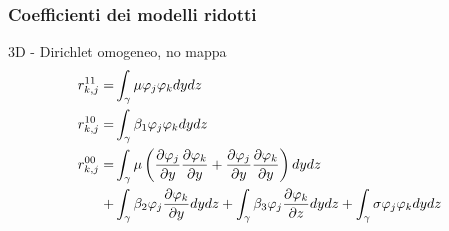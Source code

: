 \hypertarget{coeffRE}
{
\begin{frame}[noframenumbering]
\frametitle{Coefficienti dei modelli ridotti}
\hyperlink{coeffR}{}
\begin{block}{3D - Dirichlet omogeneo, no mappa}
\vspace{-0.3cm}
\begin{equation}
\begin{split}
  r^{11}_{k,j}=&\int_{\gamma}\mu\varphi_j\varphi_k dy dz\\
  r^{10}_{k,j}=&\int_{\gamma}\beta_1\varphi_j\varphi_k dy dz\\
  r^{00}_{k,j}=&\int_{\gamma}\mu\left(\frac{\partial \varphi_j}{\partial y}\frac{\partial \varphi_k}{\partial y}+\frac{\partial \varphi_j}{\partial y}\frac{\partial \varphi_k}{\partial y}\right) dy dz\\
                                + &\int_{\gamma}\beta_2\varphi_j\frac{\partial \varphi_k}{\partial y} dy dz
                                + \int_{\gamma}\beta_3\varphi_j\frac{\partial \varphi_k}{\partial z} dy dz
                                + \int_{\gamma}\sigma\varphi_j\varphi_k dy dz\\
\end{split}
\end{equation}
\end{block}
\end{frame}
}

\flushlinkimages
